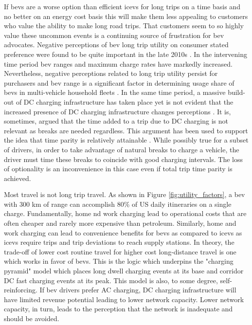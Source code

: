 \begin{multicols}{2}
If \glspl{bev} are a worse option than efficient \glspl{icev} for long trips on a time basis and no better on an energy cost basis this will make them less appealing to customers who value the ability to make long road trips. That customers seem to so highly value these uncommon events is a continuing source of frustration for \gls{bev} advocates. Negative perceptions of \gls{bev} long trip utility on consumer stated preference were found to be quite important in the late 2010s \cite{Skippon_2016, Hardman_2016, Franke_2017, Schmalfuss_2017}. In the intervening time period \gls{bev} ranges and maximum charge rates have markedly increased. Nevertheless, negative perceptions related to long trip utility persist for purchasers \cite{Bhat_2022, Paradies_2023, Corradi_2023, Philip_2023} and \gls{bev} range is a significant factor in determining usage share of \glspl{bev} in multi-vehicle household fleets \cite{Chakraborty_2022}. In the same time period, a massive build-out of DC charging infrastructure has taken place yet is not evident that the increased presence of DC charging infrastructure changes perceptions \cite{Hoogland_2023}. It is, sometimes, argued that the time added to a trip due to DC charging is not relevant as breaks are needed regardless. This argument has been used to support the idea that time parity is relatively attainable \cite{Dixon_2020}. While possibly true for a subset of drivers, in order to take advantage of natural breaks to charge a vehicle, the driver must time these breaks to coincide with good charging intervals. The loss of optionality is an inconvenience in this case even if total trip time parity is achieved.

Most travel is not long trip travel. As shown in Figure \ref{fig:utility_factors}, a \gls{bev} with 300 km of range can accomplish 80\% of US daily itineraries on a single charge. Fundamentally, home nd work charging lead to operational costs that are often cheaper and rarely more expensive than petroleum. Similarly, home and work charging can lead to convenience benefits for \glspl{bev} as compared to \glspl{icev} \cite{Rabinowitz_2023} as \glspl{icev} require trips and trip deviations to reach supply stations. In theory, the trade-off of lower cost routine travel for higher cost long-distance travel is one which works in favor of \glspl{bev}. This is the logic which underpins the "charging pyramid" model which places long dwell charging events at its base and corridor DC fast charging events at its peak. This model is also, to some degree, self-reinforcing. If \gls{bev} drivers prefer AC charging, DC charging infrastructure will have limited revenue potential leading to lower network capacity. Lower network capacity, in turn, leads to the perception that the network is inadequate and should be avoided.


\end{multicols}
